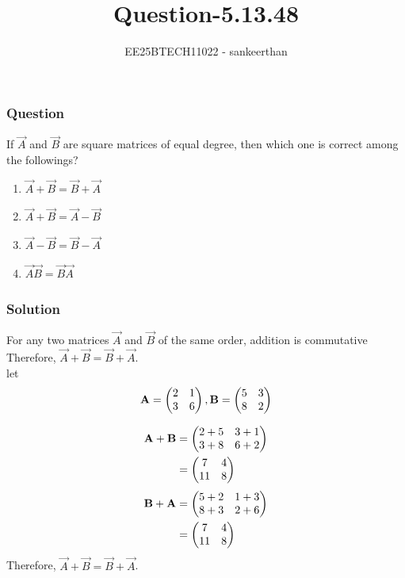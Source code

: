 \documentclass{beamer}
\title{Question-5.13.48}
\author{EE25BTECH11022 - sankeerthan}
\date{}
\begin{document}
\frame{\titlepage}

\begin{frame}
\frametitle{Question}
If $\vec{A}$ and $\vec{B}$ are square matrices of equal degree, then which one is correct among the followings? 
\begin{enumerate}
    \item $\vec{A} + \vec{B} = \vec{B} + \vec{A}$
    \item $\vec{A} + \vec{B} = \vec{A} - \vec{B}$
    \item $\vec{A} - \vec{B} = \vec{B} - \vec{A}$
    \item $\vec{A}\vec{B} = \vec{B}\vec{A}$
\end{enumerate}
\end{frame}

\begin{frame}
\frametitle{Solution}
For any two matrices $\vec{A}$ and $\vec{B}$ of the same order, addition is commutative
 Therefore, $\vec{A}+\vec{B} = \vec{B}+\vec{A}$. \\
 let
\begin{align}
\mathbf{A} = \begin{pmatrix}2 &1 \\3 &6\end{pmatrix},\mathbf{B} = \begin{pmatrix}5 &3 \\ 8 &2\end{pmatrix}     
\end{align}

\begin{align}
 \mathbf{A}+\mathbf{B} &= \begin{pmatrix}2+5 &3+1 \\3+8 &6+2\end{pmatrix} \\  
 &=\begin{pmatrix}7 &4 \\11 &8\end{pmatrix}
\end{align}
\begin{align}
 \mathbf{B}+\mathbf{A} &= \begin{pmatrix}5+2 &1+3 \\8+3 &2+6\end{pmatrix} \\  
 &=\begin{pmatrix}7 &4 \\11 &8\end{pmatrix}
\end{align}
Therefore, $\vec{A}+\vec{B} = \vec{B}+\vec{A}$.
\end{frame}
\end{document}
